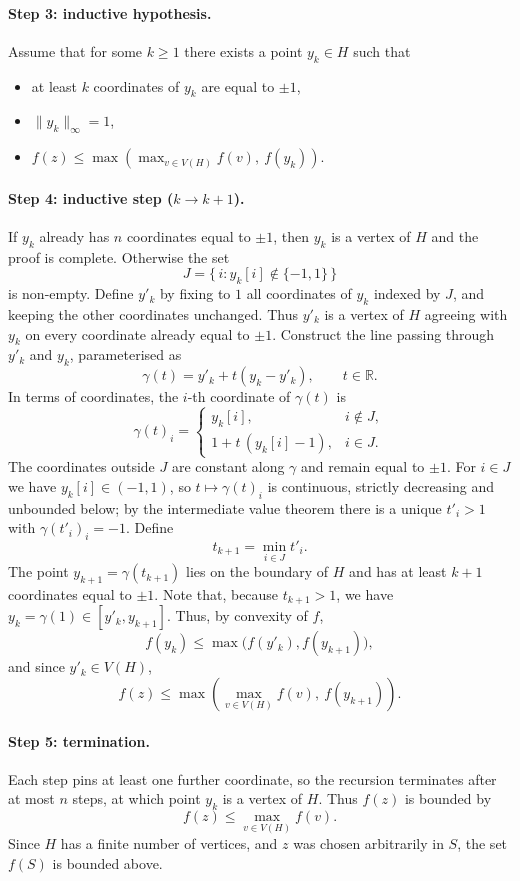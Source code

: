 \documentclass[11pt,a4paper]{article}
\begin{document}
\paragraph{Step 3: inductive hypothesis.}
Assume that for some $k \ge 1$ there exists a point $y_k \in H$ such that
\begin{itemize}
  \item at least $k$ coordinates of $y_k$ are equal to $\pm 1$,
  \item $\|y_k\|_\infty = 1$,
  \item $f(z) \le \max\left( \max_{v \in V(H)} f(v),\ f(y_k) \right)$.
\end{itemize}

\paragraph{Step 4: inductive step ($k \to k+1$).}
If $y_k$ already has $n$ coordinates equal to $\pm 1$, then $y_k$ is a vertex of
$H$ and the proof is complete. Otherwise the set
\[
  J = \{\, i : y_k[i] \notin \{-1, 1\} \,\}
\]
is non-empty. Define $y'_k$ by fixing to $1$ all coordinates of $y_k$ indexed by
$J$, and keeping the other coordinates unchanged. Thus $y'_k$ is a vertex of $H$
agreeing with $y_k$ on every coordinate already equal to $\pm 1$. Construct the
line passing through $y'_k$ and $y_k$, parameterised as
\[
  \gamma(t) = y'_k + t (y_k - y'_k), \qquad t \in \mathbb{R}.
\]
In terms of coordinates, the $i$-th coordinate of $\gamma(t)$ is
\[
  \gamma(t)_i =
  \begin{cases}
    y_k[i], & i \notin J, \\[2pt]
    1 + t\,(y_k[i] - 1), & i \in J.
  \end{cases}
\]
The coordinates outside $J$ are constant along $\gamma$ and remain equal to
$\pm 1$. For $i \in J$ we have $y_k[i] \in (-1,1)$, so $t \mapsto \gamma(t)_i$ is
continuous, strictly decreasing and unbounded below; by the intermediate value
theorem there is a unique $t'_i > 1$ with $\gamma(t'_i)_i = -1$. Define
\[
  t_{k+1} = \min_{i \in J} t'_i .
\]
The point $y_{k+1} = \gamma(t_{k+1})$ lies on the boundary of $H$ and has at
least $k+1$ coordinates equal to $\pm 1$. Note that, because $t_{k+1} > 1$, we
have $y_k = \gamma(1) \in [y'_k, y_{k+1}]$. Thus, by convexity of $f$,
\[
  f(y_k) \le \max\big( f(y'_k), f(y_{k+1}) \big),
\]
and since $y'_k \in V(H)$,
\[
  f(z) \le \max\left( \max_{v \in V(H)} f(v),\ f(y_{k+1}) \right).
\]

\paragraph{Step 5: termination.}
Each step pins at least one further coordinate, so the recursion terminates
after at most $n$ steps, at which point $y_k$ is a vertex of $H$. Thus $f(z)$ is
bounded by
\[
  f(z) \le \max_{v \in V(H)} f(v).
\]
Since $H$ has a finite number of vertices, and $z$ was chosen arbitrarily in $S$,
the set $f(S)$ is bounded above.
\end{document}
